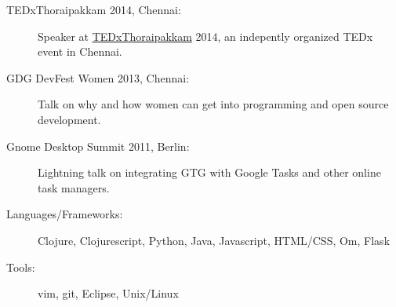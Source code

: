 \documentclass[letterpaper]{article}
\begin{document}
\begin{description}
    \item[\hspace{12pt}TEDxThoraipakkam 2014, Chennai:] \small{Speaker at \href{http://tedxtpkm.com}{TEDxThoraipakkam} 2014, an indepently organized TEDx event in Chennai.}\normalsize\vspace{-6pt}
    \item[\hspace{12pt}GDG DevFest Women 2013, Chennai:] \small{Talk on why and how women can get into programming and open source development.}\normalsize\vspace{-6pt}
    \item[\hspace{12pt}Gnome Desktop Summit 2011, Berlin:] \small{Lightning talk on integrating GTG with Google Tasks and other online task managers.}\normalsize
    
\end{description}

\begin{description}
    \item[\hspace{12pt}Languages/Frameworks:] \small{Clojure, Clojurescript, Python, Java, Javascript, HTML/CSS, Om, Flask}\normalsize\vspace{-6pt}
    \item[\hspace{12pt}Tools:] \small{vim, git, Eclipse, Unix/Linux}\normalsize
\end{description}
\end{document}
